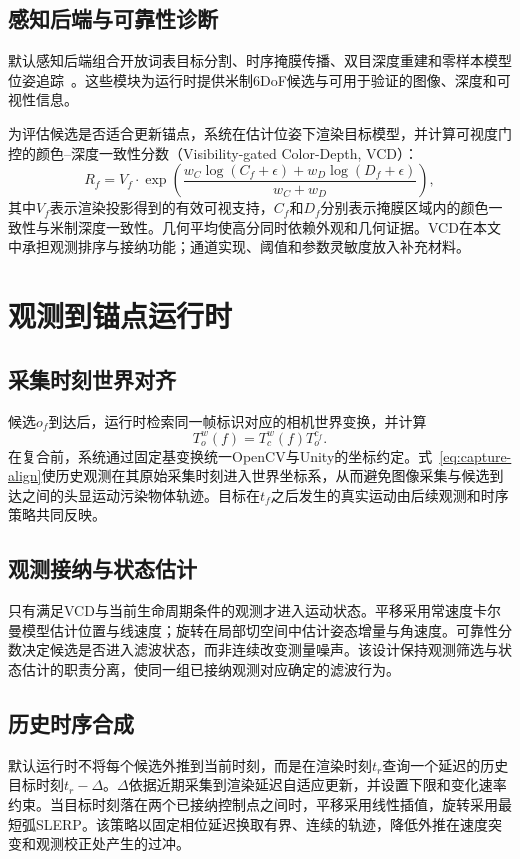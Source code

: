 \documentclass[review]{vgtc}
\begin{document}
\subsection{感知后端与可靠性诊断}
默认感知后端组合开放词表目标分割、时序掩膜传播、双目深度重建和零样本模型位姿追踪~\cite{yoloe2025,cutie2024,foundationstereo2025,foundationpose2023}。这些模块为运行时提供米制6DoF候选与可用于验证的图像、深度和可视性信息。

为评估候选是否适合更新锚点，系统在估计位姿下渲染目标模型，并计算可视度门控的颜色--深度一致性分数（Visibility-gated Color-Depth, VCD）：
\begin{equation}
R_f=V_f\cdot\exp\left(\frac{w_C\log(C_f+\epsilon)+w_D\log(D_f+\epsilon)}{w_C+w_D}\right),
\end{equation}
其中$V_f$表示渲染投影得到的有效可视支持，$C_f$和$D_f$分别表示掩膜区域内的颜色一致性与米制深度一致性。几何平均使高分同时依赖外观和几何证据。VCD在本文中承担观测排序与接纳功能；通道实现、阈值和参数灵敏度放入补充材料。

\section{观测到锚点运行时}

\subsection{采集时刻世界对齐}
候选$o_f$到达后，运行时检索同一帧标识对应的相机世界变换，并计算
\begin{equation}
  T_o^w(f)=T_c^w(f)T_o^{c_f}.
  \label{eq:capture-align}
\end{equation}
在复合前，系统通过固定基变换统一OpenCV与Unity的坐标约定。式~\ref{eq:capture-align}使历史观测在其原始采集时刻进入世界坐标系，从而避免图像采集与候选到达之间的头显运动污染物体轨迹。目标在$t_f$之后发生的真实运动由后续观测和时序策略共同反映。

\subsection{观测接纳与状态估计}
只有满足VCD与当前生命周期条件的观测才进入运动状态。平移采用常速度卡尔曼模型估计位置与线速度；旋转在局部切空间中估计姿态增量与角速度。可靠性分数决定候选是否进入滤波状态，而非连续改变测量噪声。该设计保持观测筛选与状态估计的职责分离，使同一组已接纳观测对应确定的滤波行为。

\subsection{历史时序合成}
默认运行时不将每个候选外推到当前时刻，而是在渲染时刻$t_r$查询一个延迟的历史目标时刻$t_r-\Delta$。$\Delta$依据近期采集到渲染延迟自适应更新，并设置下限和变化速率约束。当目标时刻落在两个已接纳控制点之间时，平移采用线性插值，旋转采用最短弧SLERP。该策略以固定相位延迟换取有界、连续的轨迹，降低外推在速度突变和观测校正处产生的过冲。
\end{document}
